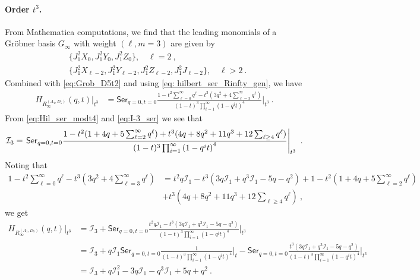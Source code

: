 \documentclass[a4paper,10pt]{article}
\newcommand{\mr}[1]{\mathsf{#1}}
\def\CI {{\cal I}}
\def\CI {{{\cal I}}}
\begin{document}
\paragraph{Order $t^3$.} From Mathematica computations, we find that the leading monomials of a Gr\"{o}bner basis $G_\infty$ with weight  $(\ell,m=3)$ are given by 
\begin{align}
&\{J_1^2X_0,J_1^2 Y_0,J^2_1 Z_0\},\quad \ell=2~,
\\
&\{J_1^2 X_{\ell-2},J_1^2 Y_{\ell-2},J^2_1 Z_{\ell-2}, J_1^2 J_{\ell-2}\},\quad \ell>2~.
\end{align}
Combined with \eqref{eq:Grob_D5t2} and using \eqref{eq: hilbert_ser_Rinfty_gen}, we have
\begin{equation}
\begin{aligned}
H_{R^{(A_1, D_5)}_{\infty}}(q, t)|_{t^3} & = \mr{Ser}_{q=0, t=0} \frac{1-t^2 \sum_{\ell=0}^{\infty}q^\ell -t^3(3 q^2 +4\sum_{\ell=3}^\infty q^\ell)}{(1-t)^3 \prod_{i=1}^{\infty}\left(1-q^i t\right)^4}\bigg|_{t^3}~.
\end{aligned}
\end{equation}
From \eqref{eq:Hil_ser_modt4} and \eqref{eq:I-3_ser} we see that 
\begin{equation}
    \CI_3=\left.\mr{Ser}_{q=0,t=0}\frac{1-t^2(1+4q + 5\sum_{\ell=2}^\infty q^\ell)+t^3(4q + 8 q^2 + 11 q^3 + 12 \sum_{\ell\geq 4}q^\ell)}{(1-t)^3 \prod_{i=1}^{\infty}\left(1-q^i t\right)^4}\right|_{t^3}~.
\end{equation}
Noting that 
\begin{equation}
\begin{split}
    1-t^2 \sum_{\ell=0}^{\infty}q^\ell -t^3\left(3 q^2 +4\sum_{\ell=3}^\infty q^\ell\right)&=t^2 q \mathcal{I}_1 - t^3(3q \mathcal{I}_1 +q^3 \mathcal{I}_1-5 q -q^2)+1-t^2\left(1+4q + 5\sum_{\ell=2}^\infty q^\ell\right)\\&+t^3\left(4q + 8 q^2 + 11 q^3 + 12 \sum_{\ell\geq 4}q^\ell\right)~,
\end{split}    
\end{equation}
we get 
\begin{equation}
\begin{split}
 H_{R^{(A_1, D_5)}_{\infty}}(q, t)|_{t^3} & = \mathcal{I}_3 +\mr{Ser}_{q=0, t=0} \frac{t^2 q \mathcal{I}_1 - t^3(3q \mathcal{I}_1 +q^3 \mathcal{I}_1-5 q -q^2)}{(1-t)^3 \prod_{i=1}^{\infty}\left(1-q^i t\right)^4}\bigg|_{t^3}
 \\
 &=\mathcal{I}_3 + q \mathcal{I}_1\mr{Ser}_{q=0, t=0} \frac{1}{(1-t)^3 \prod_{i=1}^{\infty}\left(1-q^i t\right)^4}\bigg|_{t} -\mr{Ser}_{q=0, t=0} \frac{t^3(3q \mathcal{I}_1 +q^3 \mathcal{I}_1-5 q -q^2)}{(1-t)^3 \prod_{i=1}^{\infty}\left(1-q^i t\right)^4}\bigg|_{t^3}
 \\
& = \mathcal{I}_3 + q \mathcal{I}_1^2 -3q \mathcal{I}_1 -q^3 \mathcal{I}_1+5 q +q^2~.   \end{split}    
\end{equation}
\end{document}

